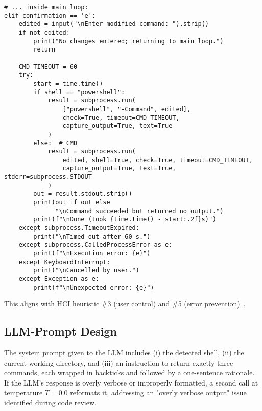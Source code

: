 \documentclass[a4paper,12pt]{article}
\begin{document}
\begin{lstlisting}[style=vscode,
                   caption={Edited-command execution with layered error handling},
                   label={lst:edited-cmd},
                   emph={subprocess,TimeoutExpired,CalledProcessError}]
# ... inside main loop:
elif confirmation == 'e':
    edited = input("\nEnter modified command: ").strip()
    if not edited:
        print("No changes entered; returning to main loop.")
        return

    CMD_TIMEOUT = 60
    try:
        start = time.time()
        if shell == "powershell":
            result = subprocess.run(
                ["powershell", "-Command", edited],
                check=True, timeout=CMD_TIMEOUT,
                capture_output=True, text=True
            )
        else:  # CMD
            result = subprocess.run(
                edited, shell=True, check=True, timeout=CMD_TIMEOUT,
                capture_output=True, text=True, stderr=subprocess.STDOUT
            )
        out = result.stdout.strip()
        print(out if out else
              "\nCommand succeeded but returned no output.")
        print(f"\nDone (took {time.time() - start:.2f}s)")
    except subprocess.TimeoutExpired:
        print("\nTimed out after 60 s.")
    except subprocess.CalledProcessError as e:
        print(f"\nExecution error: {e}")
    except KeyboardInterrupt:
        print("\nCancelled by user.")
    except Exception as e:
        print(f"\nUnexpected error: {e}")
\end{lstlisting}

\noindent This aligns with HCI heuristic \#3 (user control) and \#5 (error prevention)~\cite{ref12}. 





\subsection{LLM-Prompt Design}
\label{sec:prompt-design}
\noindent The system prompt given to the LLM includes (i) the detected shell, (ii) the current working directory, and (iii) an instruction to return exactly three commands, each wrapped in backticks and followed by a one-sentence rationale. If the LLM's response is overly verbose or improperly formatted, a second call at temperature $T=0.0$ reformats it, addressing an "overly verbose output" issue identified during code review.
\end{document}
